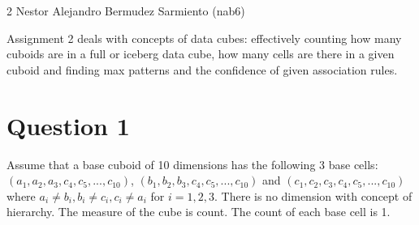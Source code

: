 \documentclass[11pt]{article}
\begin{document}
\homework
    {2}
    {Nestor Alejandro Bermudez Sarmiento (nab6)}
    {}

Assignment 2 deals with concepts of data cubes: effectively counting how many cuboids are in a full or iceberg data cube, how many cells are there in a given cuboid and finding max patterns and the confidence of given association rules.

\section*{Question 1}
Assume that a base cuboid of 10 dimensions has the following 3 base cells: \\
$(a_1, a_2, a_3, c_4, c_5, ..., c_{10})$, $(b_1, b_2, b_3, c_4, c_5, ..., c_{10})$ and $(c_1, c_2, c_3, c_4, c_5, ..., c_{10})$\\ where $a_i \neq b_i, b_i \neq c_i, c_i \neq a_i$ for $i = 1, 2, 3$. There is no dimension with concept of hierarchy. The measure of the cube is count. The count of each base cell is 1.\\
\end{document}
